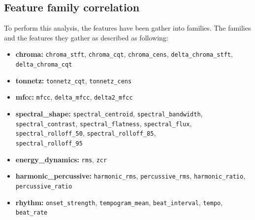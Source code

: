 \documentclass[11pt]{article}
\begin{document}
\subsection{Feature family correlation}
To perform this analysis, the features have been gather into families. The families and the features they gather as described as following:
\begin{itemize}
\item   \textbf{chroma:}               \texttt{chroma\_stft}, \texttt{chroma\_cqt}, \texttt{chroma\_cens}, \texttt{delta\_chroma\_stft}, \texttt{delta\_chroma\_cqt}
\item  \textbf{tonnetz:}              \texttt{tonnetz\_cqt}, \texttt{tonnetz\_cens}
\item  \textbf{mfcc:}                 \texttt{mfcc}, \texttt{delta\_mfcc}, \texttt{delta2\_mfcc}
\item  \textbf{spectral\_shape:}       \texttt{spectral\_centroid}, \texttt{spectral\_bandwidth}, \texttt{spectral\_contrast}, \texttt{spectral\_flatness}, \texttt{spectral\_flux}, \texttt{spectral\_rolloff\_50}, \texttt{spectral\_rolloff\_85}, \\ \texttt{spectral\_rolloff\_95}
\item  \textbf{energy\_dynamics:}      \texttt{rms}, \texttt{zcr}
\item  \textbf{harmonic\_percussive:}  \texttt{harmonic\_rms}, \texttt{percussive\_rms}, \texttt{harmonic\_ratio}, \texttt{percussive\_ratio}
\item  \textbf{rhythm:}               \texttt{onset\_strength}, \texttt{tempogram\_mean}, \texttt{beat\_interval}, \texttt{tempo}, \texttt{beat\_rate}
\end{itemize}
\end{document}
